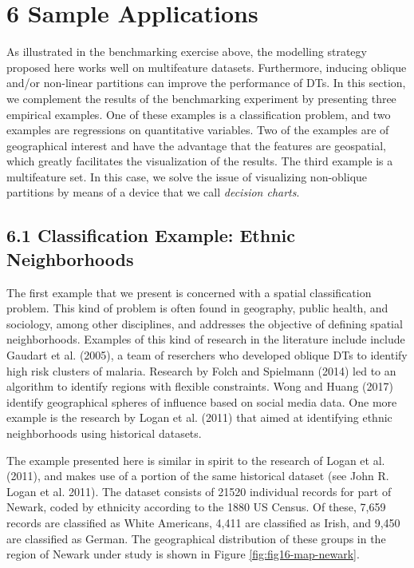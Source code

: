 \documentclass[]{elsarticle} %
\begin{document}
\section{6 Sample Applications}\label{sample-applications}

As illustrated in the benchmarking exercise above, the modelling
strategy proposed here works well on multifeature datasets. Furthermore,
inducing oblique and/or non-linear partitions can improve the
performance of DTs. In this section, we complement the results of the
benchmarking experiment by presenting three empirical examples. One of
these examples is a classification problem, and two examples are
regressions on quantitative variables. Two of the examples are of
geographical interest and have the advantage that the features are
geospatial, which greatly facilitates the visualization of the results.
The third example is a multifeature set. In this case, we solve the
issue of visualizing non-oblique partitions by means of a device that we
call \emph{decision charts}.

\subsection{6.1 Classification Example: Ethnic
Neighborhoods}\label{classification-example-ethnic-neighborhoods}

The first example that we present is concerned with a spatial
classification problem. This kind of problem is often found in
geography, public health, and sociology, among other disciplines, and
addresses the objective of defining spatial neighborhoods. Examples of
this kind of research in the literature include include Gaudart et al.
(2005), a team of reserchers who developed oblique DTs to identify high
risk clusters of malaria. Research by Folch and Spielmann (2014) led to
an algorithm to identify regions with flexible constraints. Wong and
Huang (2017) identify geographical spheres of influence based on social
media data. One more example is the research by Logan et al. (2011) that
aimed at identifying ethnic neighborhoods using historical datasets.

The example presented here is similar in spirit to the research of Logan
et al. (2011), and makes use of a portion of the same historical dataset
(see John R. Logan et al. 2011). The dataset consists of 21520
individual records for part of Newark, coded by ethnicity according to
the 1880 US Census. Of these, 7,659 records are classified as White
Americans, 4,411 are classified as Irish, and 9,450 are classified as
German. The geographical distribution of these groups in the region of
Newark under study is shown in Figure \ref{fig:fig16-map-newark}.
\end{document}

